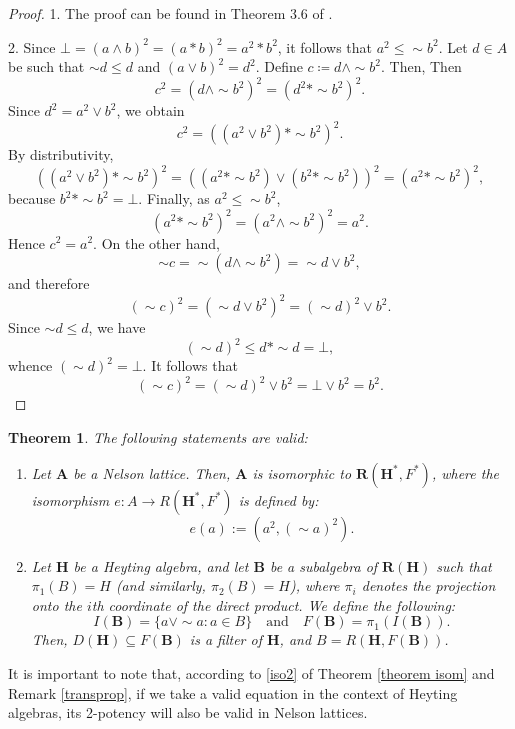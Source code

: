 \documentclass[pdflatex,sn-mathphys-num]{sn-jnl}%
\newcommand{\A}{\mathbf{A}}
\newcommand{\R}[2]{\mathbf{R}(#1,#2)}
\newcommand{\RH}[1]{\mathbf{R}(#1)}
\newcommand{\He}{\mathbf{H}}
\newcommand{\RN}[2]{R(#1,#2)}
\theoremstyle{thmstyleone}%
\newtheorem{theorem}{Theorem}%
\theoremstyle{thmstyletwo}%
\theoremstyle{thmstylethree}%
\begin{document}
\begin{proof}
    1. The proof can be found in Theorem 3.6 of \cite{Busaniche}.
    
    2. Since $\bot=(a\wedge b)^2=(a*b)^2=a^2*b^2$, it follows that $a^2\leq \sim b^2$. Let $d\in A$ be such that $\sim d\leq d$ and $(a\vee b)^2=d^2$. Define $c\coloneq d\wedge \sim b^2$. Then, 
    Then
    \[
    c^2=(d\wedge \sim b^2)^2=(d^2 * \sim b^2)^2.
    \]
    Since $d^2=a^2\vee b^2$, we obtain
    \[
    c^2=((a^2\vee b^2)*\sim b^2)^2.
    \]
    By distributivity,
    \[
    ((a^2\vee b^2)*\sim b^2)^2=((a^2*\sim b^2)\vee (b^2*\sim b^2))^2=(a^2*\sim b^2)^2,
    \]
    because $b^2*\sim b^2=\bot$. Finally, as $a^2\leq \sim b^2$,
    \[
    (a^2*\sim b^2)^2=(a^2\wedge \sim b^2)^2=a^2.
    \]
    Hence $c^2=a^2$. On the other hand,
    \[
    \sim c=\sim(d\wedge \sim b^2)=\sim d\vee b^2,
    \]
    and therefore
    \[
    (\sim c)^2=(\sim d\vee b^2)^2=(\sim d)^2\vee b^2.
    \]
    Since $\sim d\leq d$, we have
    \[
    (\sim d)^2\leq d*\sim d=\bot,
    \]
    whence $(\sim d)^2=\bot$. It follows that
    \[
    (\sim c)^2=(\sim d)^2\vee b^2=\bot\vee b^2=b^2.
    \]
\end{proof}

\begin{theorem} \label{MappingNelsonHeyting}
The following statements are valid:

\begin{enumerate}\label{theorem isom}
\item \label{iso2}
Let $\A$ be a Nelson lattice. Then, $\A$ is isomorphic to $\R{\He^*}{F^*}$, where the isomorphism $e\colon A \to \RN{\He^*}{F^*}$ is defined by:
\[
e(a) := (a^2, (\sim a)^2).
\]

\item \cite{Odintsov} Let $\He$ be a Heyting algebra, and let $\mathbf{B}$ be a subalgebra of $\RH{\He}$ such that $\pi_1(B) = H$ (and similarly, $\pi_2(B) = H$), where $\pi_i$ denotes the projection onto the $i$th coordinate of the direct product. We define the following:
\[
I(\mathbf{B}) = \{a \vee \sim a : a \in B\} \quad \text{and} \quad F(\mathbf{B}) = \pi_1(I(\mathbf{B})).
\]
Then, $D(\He) \subseteq F(\mathbf{B})$ is a filter of $\He$, and  $B = \RN{\He}{F(\mathbf{B})}$.
\end{enumerate}
\end{theorem}


It is important to note that, according to \ref{iso2} of Theorem \ref{theorem isom} and Remark \ref{transprop}, if we take a valid equation in the context of Heyting algebras, its 2-potency will also be valid in Nelson lattices.
\end{document}

